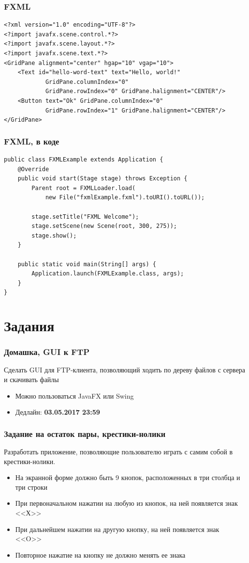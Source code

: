\documentclass[xetex,mathserif,serif]{beamer}
\begin{document}
	\begin{frame}[fragile]
		\frametitle{FXML}
		\begin{verbatim}
<?xml version="1.0" encoding="UTF-8"?>
<?import javafx.scene.control.*?>
<?import javafx.scene.layout.*?>
<?import javafx.scene.text.*?>
<GridPane alignment="center" hgap="10" vgap="10">
    <Text id="hello-word-text" text="Hello, world!"
            GridPane.columnIndex="0"
            GridPane.rowIndex="0" GridPane.halignment="CENTER"/>
    <Button text="Ok" GridPane.columnIndex="0"
            GridPane.rowIndex="1" GridPane.halignment="CENTER"/>
</GridPane>
		\end{verbatim}
\end{frame}

	\begin{frame}[fragile]
		\frametitle{FXML, в коде}
		\begin{verbatim}
public class FXMLExample extends Application {
    @Override
    public void start(Stage stage) throws Exception {
        Parent root = FXMLLoader.load(
            new File("fxmlExample.fxml").toURI().toURL());

        stage.setTitle("FXML Welcome");
        stage.setScene(new Scene(root, 300, 275));
        stage.show();
    }

    public static void main(String[] args) {
        Application.launch(FXMLExample.class, args);
    }
}
		\end{verbatim}
\end{frame}

	\section{Задания}

	\begin{frame}
		\frametitle{Домашка, GUI к FTP}
		Сделать GUI для FTP-клиента, позволяющий ходить по дереву файлов с сервера и скачивать файлы
		\begin{itemize}
			\item Можно пользоваться JavaFX или Swing
			\item Дедлайн: \textbf{03.05.2017 23:59}
		\end{itemize}
	\end{frame}

	\begin{frame}
		\frametitle{Задание на остаток пары, крестики-нолики}
		Разработать приложение, позволяющие пользователю играть с самим собой в крестики-нолики. 
		\begin{itemize}
			\item На экранной форме должно быть 9 кнопок, расположенных в три столбца и три строки
			\item При первоначальном нажатии на любую из кнопок, на ней появляется знак <<Х>> 
			\item При дальнейшем нажатии на другую кнопку, на ней появляется знак <<O>>
			\item Повторное нажатие на кнопку не должно менять ее знака
		\end{itemize}
	\end{frame}
\end{document}
